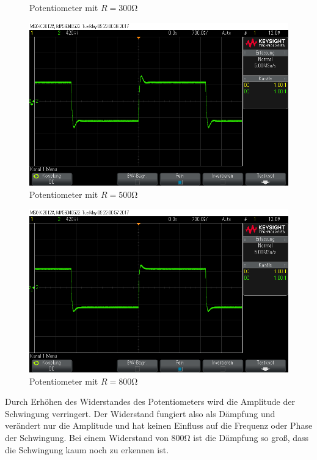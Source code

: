 \documentclass[10pt]{scrreprt}
\begin{document}
\begin{center}
\begin{figure}[H]
                \caption{Potentiometer mit $R = 300\si{\ohm}$}
            \end{figure}
            \begin{figure}[H]
                \includegraphics[width=\textwidth]{scope_17.png}
                \caption{Potentiometer mit $R = 500\si{\ohm}$}
            \end{figure}
            \begin{figure}[H]
                \includegraphics[width=\textwidth]{scope_18.png}
                \caption{Potentiometer mit $R = 800\si{\ohm}$}
            \end{figure}
        \end{center}

        Durch Erhöhen des Widerstandes des Potentiometers wird die Amplitude
        der Schwingung verringert. Der Widerstand fungiert also als Dämpfung
        und verändert nur die Amplitude und hat keinen Einfluss auf die Frequenz
        oder Phase der Schwingung. Bei einem Widerstand von $800 \si{\ohm}$ ist
        die Dämpfung so groß, dass die Schwingung kaum noch zu erkennen ist.
\end{document}
